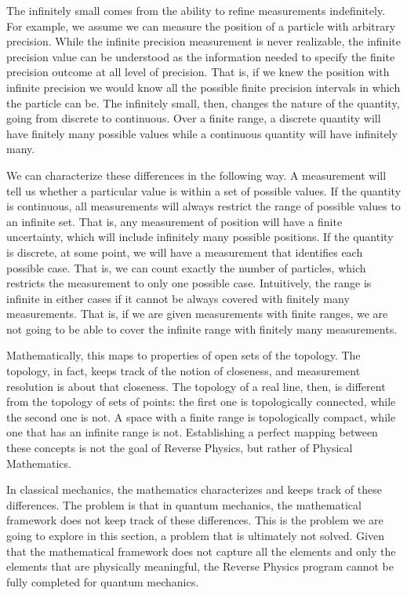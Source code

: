 The infinitely small comes from the ability to refine measurements indefinitely. For example, we assume we can measure the position of a particle with arbitrary precision. While the infinite precision measurement is never realizable, the infinite precision value can be understood as the information needed to specify the finite precision outcome at all level of precision. That is, if we knew the position with infinite precision we would know all the possible finite precision intervals in which the particle can be. The infinitely small, then, changes the nature of the quantity, going from discrete to continuous. Over a finite range, a discrete quantity will have finitely many possible values while a continuous quantity will have infinitely many.

We can characterize these differences in the following way. A measurement will tell us whether a particular value is within a set of possible values. If the quantity is continuous, all measurements will always restrict the range of possible values to an infinite set. That is, any measurement of position will have a finite uncertainty, which will include infinitely many possible positions. If the quantity is discrete, at some point, we will have a measurement that identifies each possible case. That is, we can count exactly the number of particles, which restricts the measurement to only one possible case. Intuitively, the range is infinite in either cases if it cannot be always covered with finitely many measurements. That is, if we are given measurements with finite ranges, we are not going to be able to cover the infinite range with finitely many measurements.

Mathematically, this maps to properties of open sets of the topology. The topology, in fact, keeps track of the notion of closeness, and measurement resolution is about that closeness. The topology of a real line, then, is different from the topology of sets of points: the first one is topologically connected, while the second one is not. A space with a finite range is topologically compact, while one that has an infinite range is not. Establishing a perfect mapping between these concepts is not the goal of Reverse Physics, but rather of Physical Mathematics.

In classical mechanics, the mathematics characterizes and keeps track of these differences. The problem is that in quantum mechanics, the mathematical framework does not keep track of these differences. This is the problem we are going to explore in this section, a problem that is ultimately not solved. Given that the mathematical framework does not capture all the elements and only the elements that are physically meaningful, the Reverse Physics program cannot be fully completed for quantum mechanics.

